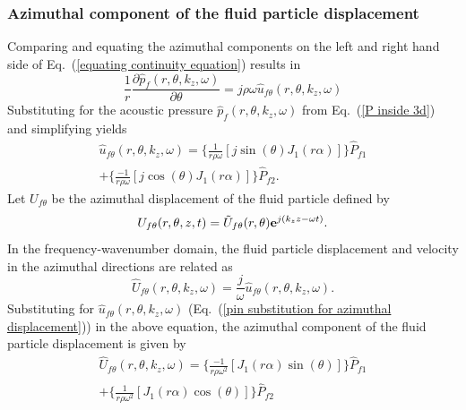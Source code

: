 \documentclass[twocolumn,10pt]{asme2ej}
\begin{document}
\subsubsection{Azimuthal component of the fluid particle displacement}
Comparing and equating the azimuthal components on the left and right hand side of Eq.~(\ref{equating continuity equation}) results in
\begin{equation}\label{pin j direction}
    \frac{1}{r}\frac{\partial \hat{p}_f(r,\theta,k_z,\omega)}{\partial \theta} = j\rho\omega \hat{u}_{f\theta}(r,\theta,k_z,\omega)
\end{equation}
Substituting for the acoustic pressure $\hat{p}_f(r,\theta,k_z,\omega)$ from Eq.~(\ref{P inside 3d}) and simplifying yields
\begin{multline}\label{pin substitution for azimuthal displacement}
    \hat{u}_{f\theta}(r,\theta,k_z,\omega) = \Bigg\{\frac{1}{r\rho\omega}[j \sin(\theta)J_1(r\alpha)]\Bigg\}\hat{P}_{f1}\\ + \Bigg\{\frac{-1}{r\rho\omega}[j\cos(\theta)J_1(r\alpha)]\Bigg\}\hat{P}_{f2}.
\end{multline}
Let $U_{f\theta}$ be the azimuthal displacement of the fluid particle defined by
\begin{equation}\label{azim disp 3d derivation}
    U_{f\theta}(r,\theta,z,t) = \Tilde{U}_{f\theta}(r,\theta) \mathbf{e}^{j(k_z z - \omega t)}.
\end{equation}
In the frequency-wavenumber domain, the fluid particle displacement and velocity in the azimuthal directions are related as
\begin{equation}\label{equating azimuthal disp and vel}
    \hat{U}_{f\theta}(r,\theta,k_z,\omega) = \frac{j}{\omega}\hat{u}_{f\theta}(r,\theta,k_z,\omega).
\end{equation}
Substituting for $\hat{u}_{f\theta}(r,\theta,k_z,\omega)$ (Eq.~(\ref{pin substitution for azimuthal displacement})) in the above equation, the azimuthal component of the fluid particle displacement is given by
\begin{multline}\label{azimuthal displacement inside 3d}
    \hat{U}_{f\theta}(r,\theta,k_z,\omega) = \Bigg\{\frac{-1}{r\rho\omega^2}[J_1(r\alpha)\sin(\theta)]\Bigg\}\hat{P}_{f1}\\ + \Bigg\{\frac{1}{r\rho\omega^2}[J_1(r\alpha)\cos(\theta)]\Bigg\}\hat{P}_{f2}
\end{multline}
\end{document}
